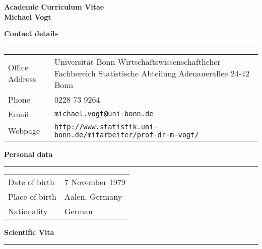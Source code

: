 \documentclass[a4paper,12pt]{article}
\begin{document}
 


\begin{center}
{\Large \textbf{Academic Curriculum Vitae}} \\[0.3cm]
{\Large \textbf{Michael Vogt}}
\end{center}
\vspace{1cm}


\renewcommand{\arraystretch}{1.3}


{\normalsize \textbf{Contact details}} \\[-0.2cm]
\rule{\textwidth}{0.2pt}

\vspace{0.3cm}
\begin{tabular}{@{} p{3.75cm} p{12cm}}
Office Address        & {Universit\"at Bonn \newline
                         Wirtschaftswissenschaftlicher Fachbereich \newline
                         Statistische Abteilung \newline
                         Adenauerallee 24-42 \newline 
                         53113 Bonn} \\
Phone                 & 0228 73 9264 \\
Email                 & \texttt{michael.vogt@uni-bonn.de} \\
Webpage               & {\texttt{http://www.statistik.uni-bonn.de/mitarbeiter/}\newline\texttt{prof-dr-m-vogt/}} 
\end{tabular}
\vspace{0.5cm}


{\normalsize \textbf{Personal data}} \\[-0.2cm]
\rule{\textwidth}{0.2pt}

\vspace{0.3cm}
\begin{tabular}{@{} p{3.75cm} p{12cm}}
Date of birth   &   7 November 1979  \\ 
Place of birth  &   Aalen, Germany  \\
Nationality     &   German  \\
\end{tabular}
\vspace{0.5cm}


{\normalsize \textbf{Scientific Vita}} \\[-0.2cm]
\rule{\textwidth}{0.2pt}
\end{document}
